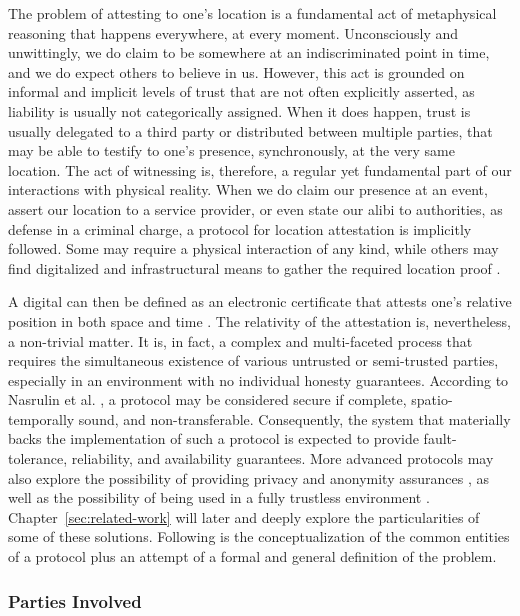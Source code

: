 The problem of attesting to one's location is a fundamental act of metaphysical reasoning that happens everywhere, at every moment. Unconsciously and unwittingly, we do claim to be somewhere at an indiscriminated point in time, and we do expect others to believe in us. However, this act is grounded on informal and implicit levels of trust that are not often explicitly asserted, as liability is usually not categorically assigned. When it does happen, trust is usually delegated to a third party or distributed between multiple parties, that may be able to testify to one's presence, synchronously, at the very same location. The act of witnessing is, therefore, a regular yet fundamental part of our interactions with physical reality. When we do claim our presence at an event, assert our location to a service provider, or even state our alibi to authorities, as defense in a criminal charge, a protocol for location attestation is implicitly followed. Some may require a physical interaction of any kind, while others may find digitalized and infrastructural means to gather the required location proof \cite{luo2010veriplace}.

A digital \pol{} can then be defined as an electronic certificate that attests one's relative position in both space and time \cite{amoretti2018blockchain}. The relativity of the attestation is, nevertheless, a non-trivial matter. It is, in fact, a complex and multi-faceted process that requires the simultaneous existence of various untrusted or semi-trusted parties, especially in an environment with no individual honesty guarantees. According to Nasrulin et al. \cite{nasrulin2018robust}, a \pol{} protocol may be considered secure if complete, spatio-temporally sound, and non-transferable. Consequently, the system that materially backs the implementation of such a protocol is expected to provide fault-tolerance, reliability, and availability guarantees. More advanced protocols may also explore the possibility of providing privacy and anonymity assurances \cite{li2020privacy}, as well as the possibility of being used in a fully trustless environment \cite{amoretti2018blockchain}. Chapter~\ref{sec:related-work} will later and deeply explore the particularities of some of these solutions. Following is the conceptualization of the common entities of a \pol{} protocol plus an attempt of a formal and general definition of the problem.

\subsubsection{Parties Involved}

